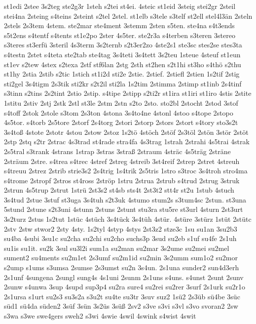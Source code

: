 {st1edi
2stee
3s2teg
ste2g3r
1steh
s2tei
st4ei.
4steic
st1eid
3steig
stei2gr
2steil
stei4na
2steing
s4teins
2steint
s2tel
2stel.
st1elb
s3tele
s3telf
st2ell
stel4l3än
2steln
2stels
2s3tem
4stem.
ste2mar
ste4ment
3stemm
2sten
s5ten.
ste4na
s4t3ends
s5t2ens
s4tentf
s4tents
st1e2po
2ster
4s5ter.
ste2r3a
s4terben
s3teren
3stereo
s3teres
st3erfü
3steril
4s3term
3s2ternb
s2t3er2zo
4ste2s1
ste3sc
stes2se
stes3ta
s4testn
2stet
s4teta
ste2tab
ste4tag
3s4teti
3s4tett
3s2teu
1steue
4steuf
st1eun
st1ev
s2tew
4stex
s2texa
2stf
stf6lan
2stg
2sth
st2hen
s2t1hi
st3ho
s4thö
s2thu
st1hy
2stia
2stib
s2tic
1stich
st1i2d
sti2e
2stie.
2stief.
2stiefl
2stien
1s2tif
2stig
sti2gel
3s4tigm
2s3tik
sti2kr
s2t2il
sti2la
1s2tim
2stimma
2stimp
st1inb
2s4tinf
s3tinn
s2tins
2s2tint
2stio
2stip.
s4tipe
2stipp
s2ti2r
st1ira
st1iri
st1iro
4stis
2stite
1stitu
2stiv
2stj
2stk
2stl
st3le
2stm
2stn
s2to
2sto.
sto2bl
2stocht
2stod
3stof
s4toff
2stok
2stole
s3tom
2s3ton
4stona
3s4to4ne
4stonl
4stoo
s4tope
2stopo
4s5tor.
s4torb
2s5tore
2storf
2s4torg
2stori
2storp
2stors
2stort
s4tory
sto3s2t
3s4toß
4stote
2stotr
4stou
2stow
2stoz
1s2tö
4stöch
2stöf
2s3töl
2stön
3stör
2stöt
2stp
2stq
s2tr
2strac
4s3trad
st4rade
stra4fa
4s3trag
1strah
2strahi
4s5trai
4strak
2s5tral
s3trank
4strans
1strap
3stras
3straß
2straum
4sträc
4s5träg
2sträne
2sträum
2stre.
s4trea
s4trec
4stref
2streg
4streib
3st4reif
2strep
2stret
4streuh
s4treuu
2strez
2strib
strie3s2
2s4trig
1s4trik
2s5tris
1stro
s3troc
3s4troh
stro4ma
s4trome
2stropf
2stros
st4ross
2ströp
1stru
2strua
2strub
s4trud
2strug
3struk
2strun
4s5trup
2strut
1strü
2st3s2
st4sb
sts4t
2st3t2
stt4r
st2u
1stub
4stuch
3s4tud
2stue
3stuf
st3uga
3s4tuh
s2t3uk
4stumo
stum2s
s3tum4sc
2stun.
st3una
5stund
2stune
s2t3uni
4stunn
2stuns
2stunt
stu3ra
stu5re
st3url
4sturn
2st3urt
3s2turz
2stus
1s2tut
1stüc
4stüch
3s4tück
3s4tüh
4stür.
4stüre
3stürz
1stüt
2stütc
2stv
2stw
stwor2
2sty
4sty.
1s2tyl
4styp
4stys
2st3z2
stze3c
1su
su1an
3su2b3
su4ba
4subi
3su1c
su2cha
su2chi
su2cho
suchs3p
3sud
su2eb
s1uf
su4fe
2s1uh
su1is
su1it.
su2k
3sul
su3l2i
sum1a
su2man
su2mar
3s2ume
su2mei
su2mel
sument2
su4ments
su2m1et
2s3umf
su2m1id
su2min
3s2umm
sum1o2
su2mor
s2ump
s1ums
s3umsa
2sumse
2s3umst
su2n
3s4un.
2s1una
sunder2
sun4d3erh
2s1unf
4sungena
2sungl
sung4s
4s1uni
2sunm
2s1uns
s4uns.
s4unst
2sunt
2sunv
2sunw
s4unwa
3sup
4supd
sup3p4
su2ra
sure4
su2rei
su2rer
3surf
2s1urk
su2r1o
2s1ursa
s1urt
su2s3
su3s2a
s3u2t
su4te
su3tr
3suv
suz2
1sü2
2s3üb
sü4be
3süc
süd1
sü4da
süden2
3süf
3sün
3s2üs
3süß
2sv2
s3ve
s3vi
s3vl
s3vo
svoran2
2sw
s3wa
s3we
swe4gers
sweh2
s3wi
4swie
4swil
4swink
s4wist
4swit
}
